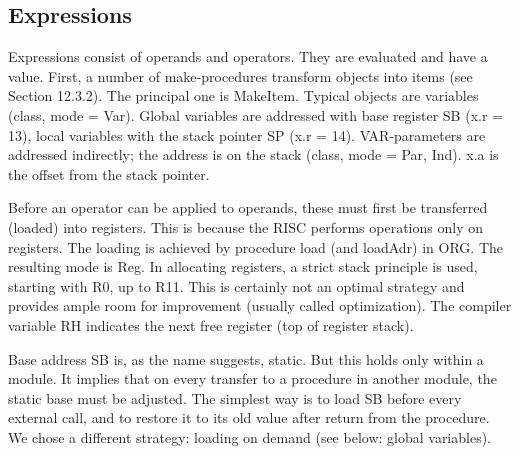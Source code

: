 \subsection{Expressions}
Expressions consist of operands and operators. They are evaluated and have a value. First, a
number of make-procedures transform objects into items (see Section 12.3.2). The principal one is
MakeItem. Typical objects are variables (class, mode = Var). Global variables are addressed with
base register SB (x.r = 13), local variables with the stack pointer SP (x.r = 14). VAR-parameters
are addressed indirectly; the address is on the stack (class, mode = Par, Ind). x.a is the offset from the stack pointer.

Before an operator can be applied to operands, these must first be transferred (loaded) into
registers. This is because the RISC performs operations only on registers. The loading is achieved
by procedure load (and loadAdr) in ORG. The resulting mode is Reg. In allocating registers, a strict
stack principle is used, starting with R0, up to R11. This is certainly not an optimal strategy and
provides ample room for improvement (usually called optimization). The compiler variable RH
indicates the next free register (top of register stack).

Base address SB is, as the name suggests, static. But this holds only within a module. It implies
that on every transfer to a procedure in another module, the static base must be adjusted. The
simplest way is to load SB before every external call, and to restore it to its old value after return
from the procedure. We chose a different strategy: loading on demand (see below: global
variables).


